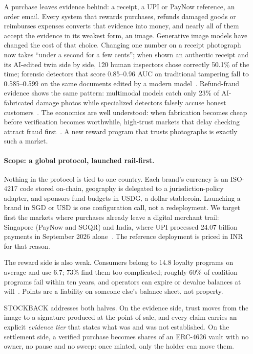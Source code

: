 \documentclass[10.5pt,letterpaper]{article}
\theoremstyle{definition}
\theoremstyle{remark}
\begin{document}
A purchase leaves evidence behind: a receipt, a UPI or PayNow reference, an order email. Every system that rewards
purchases, refunds damaged goods or reimburses expenses converts that evidence into money, and nearly all of
them accept the evidence in its weakest form, an image. Generative image models have changed the cost of that
choice. Changing one number on a receipt photograph now takes ``under a second for a few cents''; when shown an
authentic receipt and its AI-edited twin side by side, 120 human inspectors chose correctly
50.1\% of the time; forensic detectors that score 0.85--0.96 AUC on traditional tampering fall to
0.585--0.599 on the same documents edited by a modern model~\cite{wu2026forger}. Refund-fraud evidence shows the same
pattern: multimodal models catch only 23\% of AI-fabricated damage photos while specialized detectors
falsely accuse honest customers~\cite{yan2026fraudbench}. The economics are well understood: when fabrication becomes cheap
before verification becomes worthwhile, high-trust markets that delay checking attract fraud first~\cite{yin2026trust}.
A new reward program that trusts photographs is exactly such a market.

\paragraph{Scope: a global protocol, launched rail-first.} Nothing in the protocol is tied to one country. Each brand's
currency is an ISO-4217 code stored on-chain, geography is delegated to a jurisdiction-policy adapter, and sponsors fund
budgets in USDG, a dollar stablecoin. Launching a brand in SGD or USD is one configuration call, not a redeployment. We
target first the markets where purchases already leave a digital merchant trail: Singapore (PayNow and SGQR) and India,
where UPI processed 24.07 billion payments in September 2026 alone~\cite{npci2026}. The reference deployment is priced in
INR for that reason.

The reward side is also weak. Consumers belong to 14.8 loyalty programs on average and use 6.7; 73\% find
them too complicated; roughly 60\% of coalition programs fail within ten years, and operators can expire or
devalue balances at will~\cite{oamen2025rewards}. Points are a liability on someone else's balance sheet, not property.

STOCKBACK addresses both halves. On the evidence side, trust moves from the image to a signature produced at the
point of sale, and every claim carries an explicit \emph{evidence tier} that states what was and was not
established. On the settlement side, a verified purchase becomes shares of an ERC-4626 vault with no owner, no
pause and no sweep: once minted, only the holder can move them.
\end{document}
